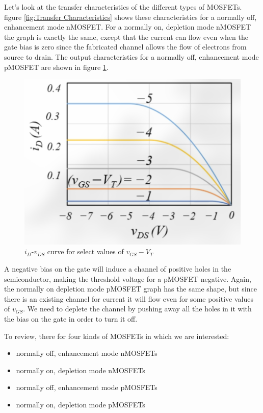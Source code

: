 \documentclass[nobib]{tufte-handout}
\begin{document}
Let's look at the transfer characteristics of 
the different types of MOSFETs. figure \ref{fig:Transfer Characteristics} 
shows these characteristics for a normally off, enhancement mode 
nMOSFET.
For a normally on, depletion mode nMOSFET the graph is exactly 
the same, except that the current can flow even when the 
gate bias is zero since the fabricated channel allows 
the flow of electrons from source to drain.
The output characteristics for a normally off, enhancement mode pMOSFET
are shown in figure \ref{fig:idvgsvt pmosfet}.
\begin{figure}
    \caption{$i_D$-$v_{DS}$ curve for select values of $v_{GS}-V_T$}
    \label{fig:idvgsvt pmosfet}
    \includegraphics{output characteristics pmosfet.png}
\end{figure}
A negative bias on the gate will induce a channel of positive holes 
in the semiconductor, making the threshold voltage for a pMOSFET 
negative. Again, the normally on depletion mode pMOSFET graph has the same 
shape, but since there is an existing channel for current it will flow even for 
some positive values of $v_{GS}$. We need to deplete the channel by pushing away all 
the holes in it with the bias on the gate in order to turn it off. 

To review, there for four kinds of MOSFETs in which we are interested:
\begin{itemize}
    \item normally off, enhancement mode nMOSFETs
    \item normally on, depletion mode nMOSFETs
    \item normally off, enhancement mode pMOSFETs
    \item normally on, depletion mode pMOSFETs
\end{itemize}
\end{document}
